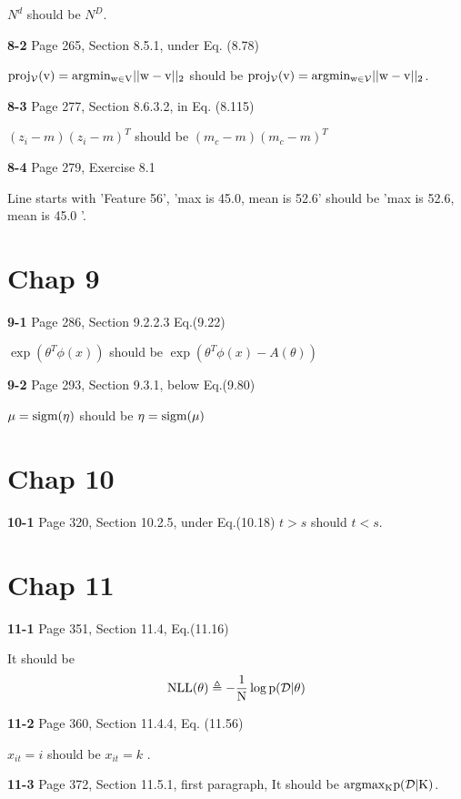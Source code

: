 \documentclass[aps,preprint,a4]{revtex4-1}
\newcommand{\nl}{\nonumber \\}
\begin{document}
$N^{d}$ should be $N^{D}$.

{\color{red}\textbf{8-2}} Page 265, Section 8.5.1, under Eq. (8.78)

$\rm proj_{\mathcal V}(v)=\rm argmin_{w\in V}||\rm w-\rm v||_{2}$ should be 
$\rm proj_{\mathcal V}(v)=\rm argmin_{w\in \mathcal V}||w-v||_{2}$.

{\color{red}\textbf{8-3}} Page 277, Section 8.6.3.2, in Eq. (8.115)

$(z_{i}-m)(z_{i}-m)^{T}$ should be $(m_{c}-m)(m_{c}-m)^{T}$

{\color{red}\textbf{8-4}} Page 279, Exercise 8.1 

Line starts with 'Feature 56', 'max is 45.0, mean is 52.6' should be
'max is 52.6, mean is 45.0 '.



\section{Chap 9}
{\color{red}\textbf{9-1}} Page 286, Section 9.2.2.3 Eq.(9.22)

$\exp{(\theta^{T}\phi(x))}$ should be $\exp{(\theta^{T}\phi(x)-A(\theta))}$

{\color{red}\textbf{9-2}} Page 293, Section 9.3.1, below Eq.(9.80)

$\mu = \rm sigm(\eta)$ should be $\eta = \rm sigm(\mu)$


\section{Chap 10}
{\color{red}\textbf{10-1}} Page 320, Section 10.2.5, under Eq.(10.18)
$t>s$ should $t<s$.

\section{Chap 11}
{\color{red}\textbf{11-1}} Page 351, Section 11.4, Eq.(11.16)

It should be
\begin{equation}
\rm NLL(\theta) \triangleq -\frac{1}{N} \log p(\mathcal D|\theta)\nl
\end{equation}

{\color{red}\textbf{11-2}} Page 360, Section 11.4.4, Eq. (11.56)

$x_{it}=i$ should be $x_{it}=k$ .

{\color{red}\textbf{11-3}} Page 372, Section 11.5.1, first paragraph,
It should be $\rm argmax_{K}p(\mathcal D|K)$.
\end{document}
